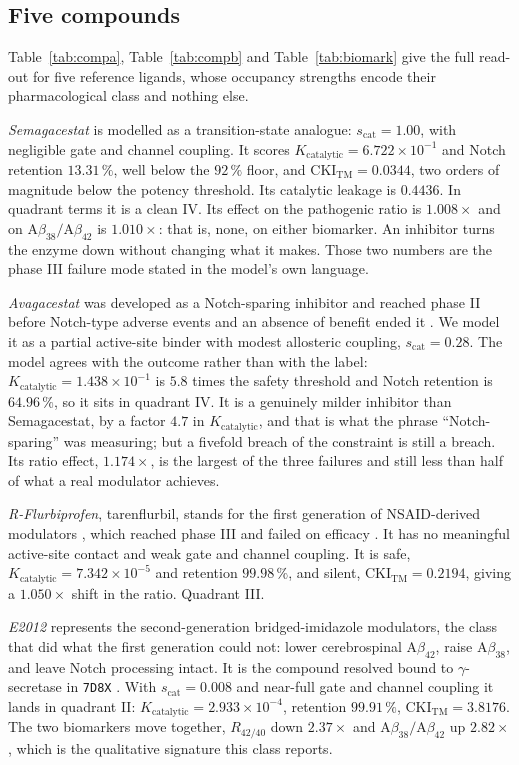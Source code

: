 \documentclass[11pt,reqno]{amsart}
\theoremstyle{plain}
\theoremstyle{definition}
\theoremstyle{remark}
\numberwithin{equation}{section}
\newcommand{\CKI}{\mathrm{CKI}}
\newcommand{\Kcat}{K_{\mathrm{catalytic}}}
\newcommand{\CKItm}{\CKI_{\mathrm{TM}}}
\newcommand{\Ab}{\mathrm{A}\beta}
\begin{document}
\subsection{Five compounds}
\label{sec:compounds}
Table~\ref{tab:compa}, Table~\ref{tab:compb} and Table~\ref{tab:biomark} give the full read-out for five reference ligands, whose occupancy strengths encode their pharmacological class and nothing else.

\emph{Semagacestat} is modelled as a transition-state analogue: $s_{\mathrm{cat}}=1.00$, with negligible gate and channel coupling. It scores $\Kcat=6.722\times10^{-1}$ and Notch retention $13.31\,\%$, well below the $92\,\%$ floor, and $\CKItm=0.0344$, two orders of magnitude below the potency threshold. Its catalytic leakage is $0.4436$. In quadrant terms it is a clean IV. Its effect on the pathogenic ratio is $1.008\times$ and on $\Ab_{38}/\Ab_{42}$ is $1.010\times$: that is, none, on either biomarker. An inhibitor turns the enzyme down without changing what it makes. Those two numbers are the phase III failure mode \cite{Doody2013} stated in the model's own language.

\emph{Avagacestat} was developed as a Notch-sparing inhibitor and reached phase II before Notch-type adverse events and an absence of benefit ended it \cite{Coric2012}. We model it as a partial active-site binder with modest allosteric coupling, $s_{\mathrm{cat}}=0.28$. The model agrees with the outcome rather than with the label: $\Kcat=1.438\times10^{-1}$ is $5.8$ times the safety threshold and Notch retention is $64.96\,\%$, so it sits in quadrant IV. It is a genuinely milder inhibitor than Semagacestat, by a factor $4.7$ in $\Kcat$, and that is what the phrase ``Notch-sparing'' was measuring; but a fivefold breach of the constraint is still a breach. Its ratio effect, $1.174\times$, is the largest of the three failures and still less than half of what a real modulator achieves.

\emph{R-Flurbiprofen}, tarenflurbil, stands for the first generation of NSAID-derived modulators \cite{Weggen2001}, which reached phase III and failed on efficacy \cite{Green2009}. It has no meaningful active-site contact and weak gate and channel coupling. It is safe, $\Kcat=7.342\times10^{-5}$ and retention $99.98\,\%$, and silent, $\CKItm=0.2194$, giving a $1.050\times$ shift in the ratio. Quadrant III.

\emph{E2012} represents the second-generation bridged-imidazole modulators, the class that did what the first generation could not: lower cerebrospinal $\Ab_{42}$, raise $\Ab_{38}$, and leave Notch processing intact. It is the compound resolved bound to $\gamma$-secretase in \texttt{7D8X} \cite{Yang2021}. With $s_{\mathrm{cat}}=0.008$ and near-full gate and channel coupling it lands in quadrant II: $\Kcat=2.933\times10^{-4}$, retention $99.91\,\%$, $\CKItm=3.8176$. The two biomarkers move together, $R_{42/40}$ down $2.37\times$ and $\Ab_{38}/\Ab_{42}$ up $2.82\times$, which is the qualitative signature this class reports.
\end{document}
